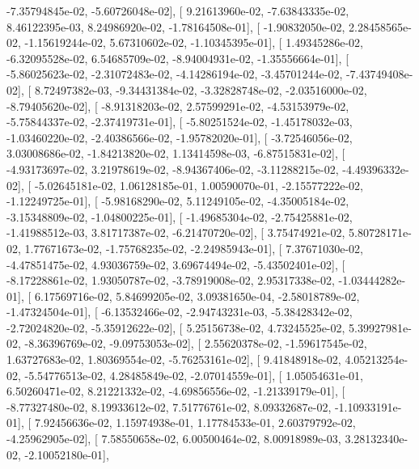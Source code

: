 \documentclass{article}
\begin{document}
         -7.35794845e-02,  -5.60726048e-02],
       [  9.21613960e-02,  -7.63843335e-02,   8.46122395e-03,
          8.24986920e-02,  -1.78164508e-01],
       [ -1.90832050e-02,   2.28458565e-02,  -1.15619244e-02,
          5.67310602e-02,  -1.10345395e-01],
       [  1.49345286e-02,  -6.32095528e-02,   6.54685709e-02,
         -8.94004931e-02,  -1.35556664e-01],
       [ -5.86025623e-02,  -2.31072483e-02,  -4.14286194e-02,
         -3.45701244e-02,  -7.43749408e-02],
       [  8.72497382e-03,  -9.34431384e-02,  -3.32828748e-02,
         -2.03516000e-02,  -8.79405620e-02],
       [ -8.91318203e-02,   2.57599291e-02,  -4.53153979e-02,
         -5.75844337e-02,  -2.37419731e-01],
       [ -5.80251524e-02,  -1.45178032e-03,  -1.03460220e-02,
         -2.40386566e-02,  -1.95782020e-01],
       [ -3.72546056e-02,   3.03008686e-02,  -1.84213820e-02,
          1.13414598e-03,  -6.87515831e-02],
       [ -4.93173697e-02,   3.21978619e-02,  -8.94367406e-02,
         -3.11288215e-02,  -4.49396332e-02],
       [ -5.02645181e-02,   1.06128185e-01,   1.00590070e-01,
         -2.15577222e-02,  -1.12249725e-01],
       [ -5.98168290e-02,   5.11249105e-02,  -4.35005184e-02,
         -3.15348809e-02,  -1.04800225e-01],
       [ -1.49685304e-02,  -2.75425881e-02,  -1.41988512e-03,
          3.81717387e-02,  -6.21470720e-02],
       [  3.75474921e-02,   5.80728171e-02,   1.77671673e-02,
         -1.75768235e-02,  -2.24985943e-01],
       [  7.37671030e-02,  -4.47851475e-02,   4.93036759e-02,
          3.69674494e-02,  -5.43502401e-02],
       [ -8.17228861e-02,   1.93050787e-02,  -3.78919008e-02,
          2.95317338e-02,  -1.03444282e-01],
       [  6.17569716e-02,   5.84699205e-02,   3.09381650e-04,
         -2.58018789e-02,  -1.47324504e-01],
       [ -6.13532466e-02,  -2.94743231e-03,  -5.38428342e-02,
         -2.72024820e-02,  -5.35912622e-02],
       [  5.25156738e-02,   4.73245525e-02,   5.39927981e-02,
         -8.36396769e-02,  -9.09753053e-02],
       [  2.55620378e-02,  -1.59617545e-02,   1.63727683e-02,
          1.80369554e-02,  -5.76253161e-02],
       [  9.41848918e-02,   4.05213254e-02,  -5.54776513e-02,
          4.28485849e-02,  -2.07014559e-01],
       [  1.05054631e-01,   6.50260471e-02,   8.21221332e-02,
         -4.69856556e-02,  -1.21339179e-01],
       [ -8.77327480e-02,   8.19933612e-02,   7.51776761e-02,
          8.09332687e-02,  -1.10933191e-01],
       [  7.92456636e-02,   1.15974938e-01,   1.17784533e-01,
          2.60379792e-02,  -4.25962905e-02],
       [  7.58550658e-02,   6.00500464e-02,   8.00918989e-03,
          3.28132340e-02,  -2.10052180e-01],
\end{document}
